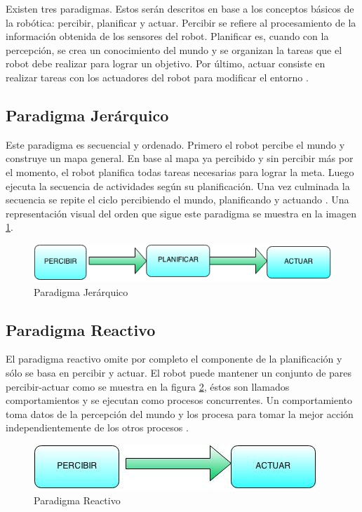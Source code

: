 Existen tres paradigmas. Estos serán descritos en base a los conceptos básicos de la robótica: percibir, planificar y actuar. Percibir se refiere al procesamiento de la información obtenida de los sensores del robot. Planificar es, cuando con la percepción, se crea un conocimiento del mundo y se organizan la tareas que el robot debe realizar para lograr un objetivo. Por último, actuar consiste en realizar tareas con los actuadores del robot para modificar el entorno \cite{AiRobotics}. 

\subsection{Paradigma Jerárquico}

Este paradigma es secuencial y ordenado. Primero el robot percibe el mundo y construye un mapa general. En base al mapa ya percibido y sin percibir m\'as por el momento, el robot planifica todas tareas necesarias para lograr la meta. Luego ejecuta la secuencia de actividades según su planificaci\'on. Una vez culminada la secuencia se repite el ciclo percibiendo el mundo, planificando y actuando \cite{AiRobotics}. Una representación visual del orden que sigue este paradigma se muestra en la imagen \ref{fig:jerarquico}.

\begin{figure}[hbtp]
\centering
\includegraphics[scale=0.4]{imagenes/jerarquico.png} 
\caption{Paradigma Jer\'arquico}
\label{fig:jerarquico}
\end{figure}


\subsection{Paradigma Reactivo}
El paradigma reactivo omite por completo el componente de la planificación y s\'olo se basa en percibir y actuar. El robot puede mantener un conjunto de pares percibir-actuar como se muestra en la figura \ref{fig:reactivo}, \'estos son llamados comportamientos y se ejecutan como procesos concurrentes. Un comportamiento toma datos de la percepción del mundo y los procesa para tomar la mejor acción independientemente de los otros procesos \cite{AiRobotics}.

\begin{figure}[hbtp]

\centering
\includegraphics[scale=0.4]{imagenes/reactivo.jpg} 
\caption{Paradigma Reactivo}
\label{fig:reactivo}
\end{figure}


